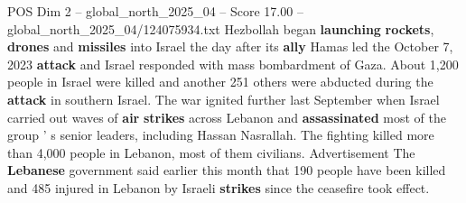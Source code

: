 \begin{textsample}{POS Dim 2 – global\_north\_2025\_04 – Score 17.00 – global\_north\_2025\_04/124075934.txt}
Hezbollah began \textbf{launching} \textbf{rockets}, \textbf{drones} and \textbf{missiles} into Israel the day after its \textbf{ally} Hamas led the October 7, 2023 \textbf{attack} and Israel responded with mass bombardment of Gaza.
About 1,200 people in Israel were killed and another 251 others were abducted during the \textbf{attack} in southern Israel.
The war ignited further last September when Israel carried out waves of \textbf{air} \textbf{strikes} across Lebanon and \textbf{assassinated} most of the group ' s senior leaders, including Hassan Nasrallah.
The fighting killed more than 4,000 people in Lebanon, most of them civilians.
Advertisement The \textbf{Lebanese} government said earlier this month that 190 people have been killed and 485 injured in Lebanon by Israeli \textbf{strikes} since the ceasefire took effect.

\end{textsample}
